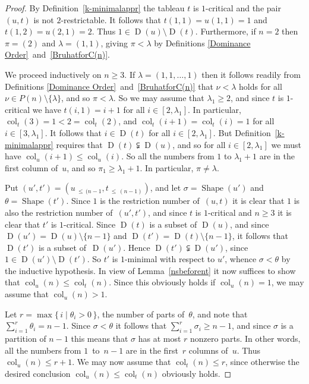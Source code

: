 \documentclass[ALCO,ThmDefs,Unicode,epreuves]{cedram}
\DeclareMathOperator{\col}{col}
\newcommand{\Lessthan}[2]{#1\,{_{\leqslant\,#2}}}
\DeclareMathOperator{\shape}{Shape}
\DeclareMathOperator{\D}{D}
\begin{document}
\begin{proof}
By Definition~\ref{k-minimalappr} the tableau $t$ is $1$-critical and the pair
$(u,t)$ is not $2$-restrictable. It follows that
$t(1,1)=u(1,1)=1$ and $t(1,2)=u(2,1)=2$. Thus $1\in\D(u)\setminus\D(t)$.
Furthermore, if $n=2$ then
$\pi=(2)$ and $\lambda=(1,1)$, giving $\pi<\lambda$ by
Definitions \ref{Dominance Order}~and~\ref{BruhatforC(n)}.

We proceed inductively on $n\geq 3$. If $\lambda=(1,1,\ldots,1)$ then it
follows readily from Definitions \ref{Dominance Order}~and~\ref{BruhatforC(n)}
that $\nu<\lambda$ holds for all $\nu\in P(n)\setminus\{\lambda\}$, and so
$\pi<\lambda$. So we may assume that $\lambda_1\geqslant 2$, and since $t$ is
$1$-critical we have $t(i,1)=i+1$ for all $i\in[2,\lambda_1]$. In particular,
$\col_t(3)=1<2=\col_t(2)$, and $\col_t(i+1)=\col_t(i)=1$ for all $i\in[3,\lambda_1]$.
It follows that $i\in\D(t)$ for all $i\in[2,\lambda_1]$. But Definition~\ref{k-minimalappr}
requires that $\D(t)\subsetneqq\D(u)$, and so for all $i\in[2,\lambda_1]$
we must have $\col_u(i+1)\leqslant\col_u(i)$. So all the numbers from $1$ to
$\lambda_1+1$ are in the first column of~$u$, and so $\pi_1\geqslant\lambda_1+1$.
In particular, $\pi\ne\lambda$.

Put $(u',t')=(\Lessthan u{(n-1},\Lessthan t{(n-1)})$, and let
$\sigma=\shape(u')$ and $\theta=\shape(t')$. Since $1$ is the restriction
number of~$(u,t)$ it is clear that $1$ is also the restriction number of~$(u',t')$,
and since $t$ is $1$-critical and $n\geqslant 3$ it is clear that $t'$
is $1$-critical. Since $\D(t)$ is a subset of $\D(u)$, and since
$\D(u')=\D(u)\setminus\{n-1\}$ and $\D(t')=\D(t)\setminus\{n-1\}$, it follows
that $\D(t')$ is a subset of~$\D(u')$. Hence $\D(t')\subsetneqq\D(u')$,
since $1\in\D(u')\setminus\D(t')$. So $t'$ is $1$-minimal with respect to
$u'$, whence $\sigma<\theta$ by the inductive hypothesis. In view of
Lemma~\ref{nsbeforent} it now suffices to show that
$\col_u(n)\leqslant\col_t(n)$. Since this obviously holds if
$\col_u(n)=1$, we may assume that $\col_u(n)>1$.

Let $r=\max\{\,i\mid\theta_i>0\,\}$, the number of parts of~$\theta$, and note
that $\sum_{i=1}^r\theta_i=n-1$. Since $\sigma<\theta$ it follows that
$\sum_{i=1}^r\sigma_i\geqslant n-1$, and since $\sigma$ is a partition of $n-1$
this means that $\sigma$ has at most $r$ nonzero parts. In other words, all the numbers
from $1$~to~$n-1$ are in the first~$r$ columns of~$u$. Thus $\col_u(n)\leqslant r+1$.
We may now assume that $\col_t(n)\leqslant r$, since otherwise the
desired conclusion $\col_u(n)\leqslant\col_t(n)$ obviously holds.


\end{proof}
\end{document}
